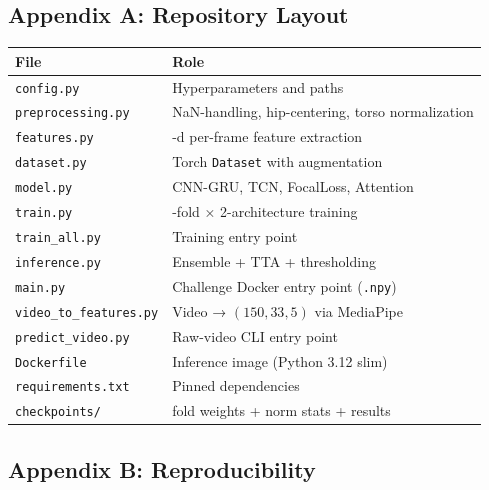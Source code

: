 \documentclass[
  11pt,
]{article}
\begin{document}
\subsection{Appendix A: Repository
Layout}\label{appendix-a-repository-layout}

\begin{longtable}[]{@{}
  >{\raggedright\arraybackslash}p{}
  >{\raggedright\arraybackslash}p{}@{}}
\toprule\noalign{}
\begin{minipage}[b]{\linewidth}\raggedright
File
\end{minipage} & \begin{minipage}[b]{\linewidth}\raggedright
Role
\end{minipage} \\
\midrule\noalign{}
\endhead
\bottomrule\noalign{}
\endlastfoot
\texttt{config.py} & Hyperparameters and paths \\
\texttt{preprocessing.py} & NaN-handling, hip-centering, torso
normalization \\
\texttt{features.py} & 518-d per-frame feature extraction \\
\texttt{dataset.py} & Torch \texttt{Dataset} with augmentation \\
\texttt{model.py} & CNN-GRU, TCN, FocalLoss, Attention \\
\texttt{train.py} & 5-fold × 2-architecture training \\
\texttt{train\_all.py} & Training entry point \\
\texttt{inference.py} & Ensemble + TTA + thresholding \\
\texttt{main.py} & Challenge Docker entry point (\texttt{.npy}) \\
\texttt{video\_to\_features.py} & Video → \((150, 33, 5)\) via
MediaPipe \\
\texttt{predict\_video.py} & Raw-video CLI entry point \\
\texttt{Dockerfile} & Inference image (Python 3.12 slim) \\
\texttt{requirements.txt} & Pinned dependencies \\
\texttt{checkpoints/} & 10 fold weights + norm stats + results \\
\end{longtable}

\subsection{Appendix B:
Reproducibility}\label{appendix-b-reproducibility}
\end{document}
